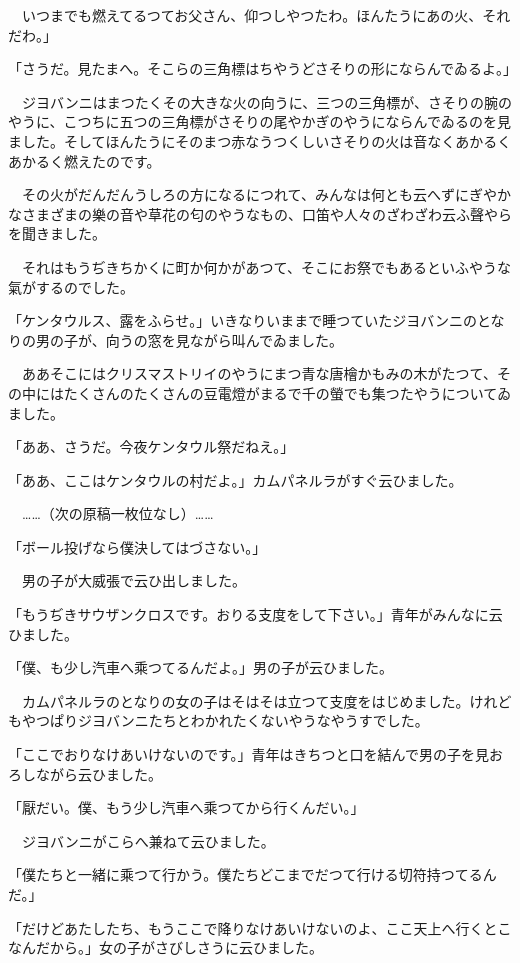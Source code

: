 \documentclass[tate,paper=b6j,jafontsize=9pt]{jlreq}
\begin{document}
　いつまでも燃えてるつてお父さん、仰つしやつたわ。ほんたうにあの火、それだわ。」

「さうだ。見たまへ。そこらの三角標はちやうどさそりの形にならんでゐるよ。」

　ジヨバンニはまつたくその大きな火の向うに、三つの三角標が、さそりの腕のやうに、こつちに五つの三角標がさそりの尾やかぎのやうにならんでゐるのを見ました。そしてほんたうにそのまつ赤なうつくしいさそりの火は音なくあかるくあかるく燃えたのです。

　その火がだんだんうしろの方になるにつれて、みんなは何とも云へずにぎやかなさまざまの樂の音や草花の匂のやうなもの、口笛や人々のざわざわ云ふ聲やらを聞きました。

　それはもうぢきちかくに町か何かがあつて、そこにお祭でもあるといふやうな氣がするのでした。

「ケンタウルス、露をふらせ。」いきなりいままで睡つていたジヨバンニのとなりの男の子が、向うの窓を見ながら叫んでゐました。

　ああそこにはクリスマストリイのやうにまつ青な唐檜かもみの木がたつて、その中にはたくさんのたくさんの豆電燈がまるで千の螢でも集つたやうについてゐました。

「ああ、さうだ。今夜ケンタウル祭だねえ。」

「ああ、ここはケンタウルの村だよ。」カムパネルラがすぐ云ひました。

　……（次の原稿一枚位なし）……

「ボール投げなら僕決してはづさない。」

　男の子が大威張で云ひ出しました。

「もうぢきサウザンクロスです。おりる支度をして下さい。」青年がみんなに云ひました。

「僕、も少し汽車へ乘つてるんだよ。」男の子が云ひました。

　カムパネルラのとなりの女の子はそはそは立つて支度をはじめました。けれどもやつぱりジヨバンニたちとわかれたくないやうなやうすでした。

「ここでおりなけあいけないのです。」青年はきちつと口を結んで男の子を見おろしながら云ひました。

「厭だい。僕、もう少し汽車へ乘つてから行くんだい。」

　ジヨバンニがこらへ兼ねて云ひました。

「僕たちと一緒に乘つて行かう。僕たちどこまでだつて行ける切符持つてるんだ。」

「だけどあたしたち、もうここで降りなけあいけないのよ、ここ天上へ行くとこなんだから。」女の子がさびしさうに云ひました。
\end{document}
